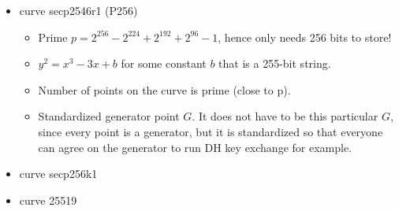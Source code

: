 \begin{itemize}
    \item curve secp2546r1 (P256) \begin{itemize}
        \item Prime $p = 2^{256} - 2^{224} + 2^{192} + 2^{96} -1$, hence only needs 256 bits to store!
        \item $y^2 = x^3 -3x + b$ for some constant $b$ that is a 255-bit string.
        \item Number of points on the curve is prime (close to p).
        \item Standardized generator point $G$. It does not have to be this particular $G$, since every point is a generator, but it is standardized so that everyone can agree on the generator to run DH key exchange for example.
    \end{itemize}
    \item curve secp256k1
    \item curve 25519
\end{itemize}